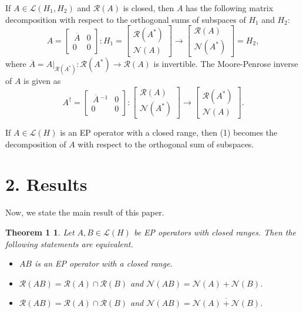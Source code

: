 \documentclass{proc-l}
\theoremstyle{plain}
\newtheorem*{theorem1}{Theorem 1}
\theoremstyle{remark}
\theoremstyle{definition}
\begin{document}
If $A\in \mathcal{L} (H_{1},H_{2})$ and $\mathcal{R} (A)$ is closed, then $A$
has the following matrix decomposition with  respect to the orthogonal sums
of subspaces of $H_{1}$ and $H_{2}$: 
\begin{equation*}
A=\left[%
\begin{matrix}
{}\,\overline {A} & 0 \\ 
0 & 0%
\end{matrix}%
\right] :H_{1}=%
\begin{bmatrix}
\mathcal{R} (A^{*}) \\ 
\mathcal{N} (A)%
\end{bmatrix}
\to 
\begin{bmatrix}
\mathcal{R} (A) \\ 
\mathcal{N} (A^{*})%
\end{bmatrix}
=H_{2},
\end{equation*}
where $\overline {A}=A|_{\mathcal{R} (A^{*})}:\mathcal{R} (A^{*})\to 
\mathcal{R} (A)$ is invertible. The Moore-Penrose inverse of $A$ is given as 
\begin{equation*}
A^{\dag }=\left[%
\begin{matrix}
{}\,\overline {A}\,^{-1} & 0 \\ 
0 & 0%
\end{matrix}%
\right] :%
\begin{bmatrix}
\mathcal{R} (A) \\ 
\mathcal{N} (A^{*})%
\end{bmatrix}
\to 
\begin{bmatrix}
\mathcal{R} (A^{*}) \\ 
\mathcal{N} (A)%
\end{bmatrix}%
.
\end{equation*}

If $A\in \mathcal{L} (H)$ is an EP operator with a closed range, then (1)
becomes the decomposition of $A$ with respect to the orthogonal sum of
subspaces.

\section*{2. Results}

Now, we state the main result of this paper.

\begin{theorem1}
Let $A,B\in \mathcal{L} (H)$ be EP operators with closed ranges.  Then the
following statements are equivalent.

\begin{itemize}
\item[(a)] $AB$ is an EP operator with a closed range.

\item[(b)] $\mathcal{R} (AB)=\mathcal{R} (A)\cap \mathcal{R} (B)$ and $%
\mathcal{N} (AB)=\mathcal{N} (A)+\mathcal{N} (B)$.

\item[(c)] $\mathcal{R} (AB)=\mathcal{R} (A)\cap \mathcal{R} (B)$ and $%
\mathcal{N} (AB)=\overline{\mathcal{N} (A)+ \mathcal{N} (B)}$.
\end{itemize}
\end{theorem1}
\end{document}
